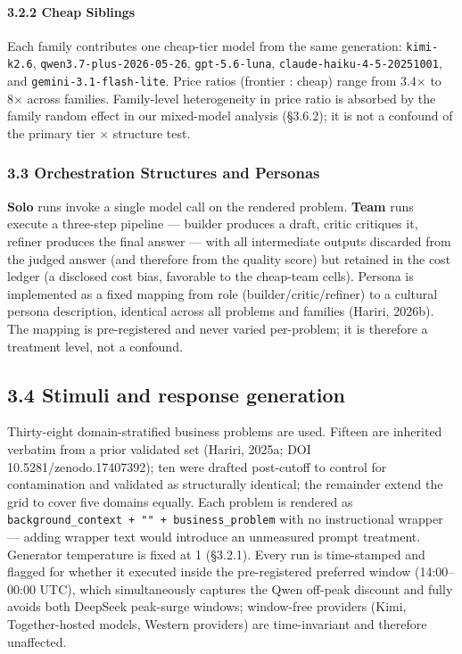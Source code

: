 \documentclass[11pt,a4paper]{article}
\begin{document}
\paragraph{3.2.2 Cheap Siblings}

Each family contributes one cheap-tier model from the same generation:
\texttt{kimi-k2.6}, \texttt{qwen3.7-plus-2026-05-26}, \texttt{gpt-5.6-luna},
\texttt{claude-haiku-4-5-20251001}, and \texttt{gemini-3.1-flash-lite}. Price ratios
(frontier : cheap) range from 3.4× to 8× across families. Family-level
heterogeneity in price ratio is absorbed by the family random effect
in our mixed-model analysis (§3.6.2); it is not a confound of the
primary tier × structure test.

\subsubsection{3.3 Orchestration Structures and Personas}

\textbf{Solo} runs invoke a single model call on the rendered problem.
\textbf{Team} runs execute a three-step pipeline — builder produces a draft,
critic critiques it, refiner produces the final answer — with all
intermediate outputs discarded from the judged answer (and therefore
from the quality score) but retained in the cost ledger (a disclosed
cost bias, favorable to the cheap-team cells). Persona is implemented
as a fixed mapping from role (builder/critic/refiner) to a cultural
persona description, identical across all problems and families
(Hariri, 2026b). The mapping is pre-registered and never varied
per-problem; it is therefore a treatment level, not a confound.

\subsection{3.4 Stimuli and response generation}

Thirty-eight domain-stratified business problems are used. Fifteen are
inherited verbatim from a prior validated set (Hariri, 2025a; DOI
10.5281/zenodo.17407392); ten were drafted post-cutoff to control for
contamination and validated as structurally identical; the remainder
extend the grid to cover five domains equally. Each problem is rendered
as \texttt{background\_context + "\n\n" + business\_problem} with no
instructional wrapper — adding wrapper text would introduce an
unmeasured prompt treatment. Generator temperature is fixed at 1
(§3.2.1). Every run is time-stamped and flagged for whether it executed
inside the pre-registered preferred window (14:00–00:00 UTC), which
simultaneously captures the Qwen off-peak discount and fully avoids
both DeepSeek peak-surge windows; window-free providers (Kimi,
Together-hosted models, Western providers) are time-invariant and
therefore unaffected.
\end{document}
